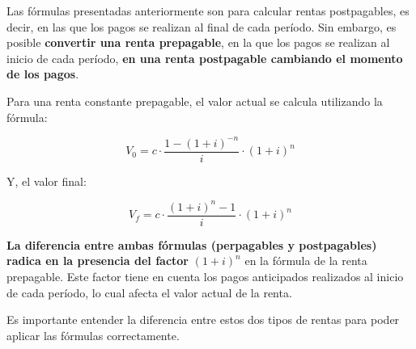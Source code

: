 \documentclass[
  letterpaper,
  DIV=11,
  numbers=noendperiod]{scrartcl}
\begin{document}
Las fórmulas presentadas anteriormente son para calcular rentas
postpagables, es decir, en las que los pagos se realizan al final de
cada período. Sin embargo, es posible \textbf{convertir una renta
prepagable}, en la que los pagos se realizan al inicio de cada período,
\textbf{en una renta postpagable cambiando el momento de los pagos}.

\begin{tcolorbox}[enhanced jigsaw, colframe=quarto-callout-note-color-frame, opacityback=0, colback=white, leftrule=.75mm, left=2mm, breakable, arc=.35mm, rightrule=.15mm, toprule=.15mm, bottomrule=.15mm]
\begin{minipage}[t]{5.5mm}
\textcolor{quarto-callout-note-color}{\faInfo}
\end{minipage}%
\begin{minipage}[t]{\textwidth - 5.5mm}

Para una renta constante prepagable, el valor actual se calcula
utilizando la fórmula:

\[V_0=c\cdot\frac{1-\left(1+i\right)^{-n}}{i}\cdot(1+i)^n\]

Y, el valor final:

\[V_f=c\cdot\frac{\left(1+i\right)^{n}-1}{i}\cdot(1+i)^n\]

\end{minipage}%
\end{tcolorbox}

\begin{tcolorbox}[enhanced jigsaw, colframe=quarto-callout-warning-color-frame, opacityback=0, colback=white, leftrule=.75mm, left=2mm, breakable, arc=.35mm, rightrule=.15mm, toprule=.15mm, bottomrule=.15mm]
\begin{minipage}[t]{5.5mm}
\textcolor{quarto-callout-warning-color}{\faExclamationTriangle}
\end{minipage}%
\begin{minipage}[t]{\textwidth - 5.5mm}

\textbf{La diferencia entre ambas fórmulas (perpagables y postpagables)
radica en la presencia del factor} \((1 + i)^n\) en la fórmula de la
renta prepagable. Este factor tiene en cuenta los pagos anticipados
realizados al inicio de cada período, lo cual afecta el valor actual de
la renta.

\end{minipage}%
\end{tcolorbox}

Es importante entender la diferencia entre estos dos tipos de rentas
para poder aplicar las fórmulas correctamente.
\end{document}
